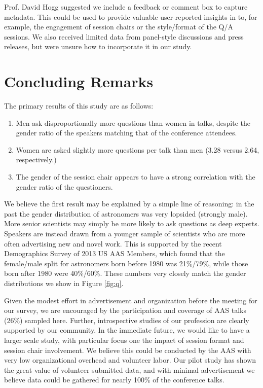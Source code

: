 \documentclass[iop]{emulateapj}
\begin{document}
Prof. David Hogg suggested we include a feedback or comment box to capture metadata. This could be used to provide valuable user-reported insights in to, for example, the engagement of session chairs or the style/format of the Q/A sessions. 
We also received limited data from panel-style discussions and press releases, but were unsure how to incorporate it in our study. 






\section{Concluding Remarks}

The primary results of this study are as follows:
\begin{enumerate}
\item Men ask disproportionally more questions than women in talks, despite the gender ratio of the speakers matching that of the conference attendees.
\item Women are asked slightly more questions per talk than men (3.28 versus 2.64, respectively.)
\item The gender of the session chair appears to have a strong correlation with the gender ratio of the questioners.
\end{enumerate}

We believe the first result may be explained by a simple line of reasoning: in the past the gender distribution of astronomers was very lopsided (strongly male). More senior scientists may simply be more likely to ask questions as deep experts. Speakers are instead drawn from a younger sample of scientists who are more often advertising new and novel work. This is supported by the recent Demographics Survey of 2013 US AAS Members, which found that the female/male split for astronomers born before 1980 was 21\%/79\%, while those born after 1980 were 40\%/60\%. These numbers very closely match the gender distributions we show in Figure \ref{fig:q}.

Given the modest effort in advertisement and organization before the meeting for our survey, we are encouraged by the participation and coverage of AAS talks (26\%) sampled here. Further, introspective studies of our profession are clearly supported by our community. In the immediate future, we would like to have a larger scale study, with particular focus one the impact of session format and session chair involvement. We believe this could be conducted by the AAS with very low organizational overhead and volunteer labor. Our pilot study has shown the great value of volunteer submitted data, and with minimal advertisement we believe data could be gathered for nearly 100\% of the conference talks.
\end{document}
